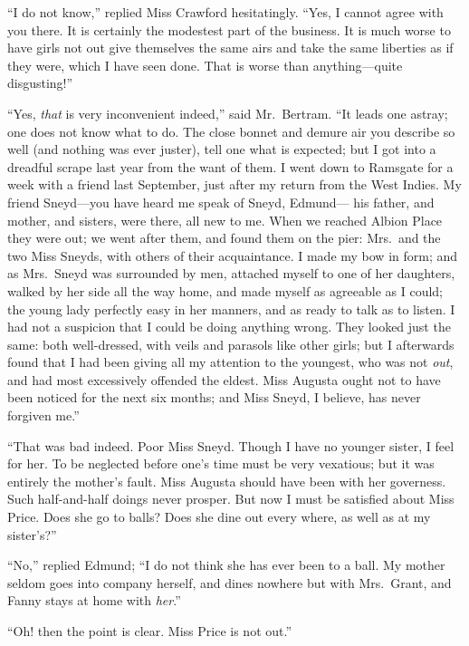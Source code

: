 ``I do not know,'' replied Miss Crawford hesitatingly.
``Yes, I cannot agree with you there.  It is certainly
the modestest part of the business.  It is much worse to
have girls not out give themselves the same airs and take
the same liberties as if they were, which I have seen done.
That is worse than anything---quite disgusting!''

``Yes, \emph{that} is very inconvenient indeed,'' said Mr.\ Bertram.
``It leads one astray; one does not know what to do.
The close bonnet and demure air you describe so well (and
nothing was ever juster), tell one what is expected;
but I got into a dreadful scrape last year from the want
of them.  I went down to Ramsgate for a week with a friend
last September, just after my return from the West Indies.
My friend Sneyd---you have heard me speak of Sneyd, Edmund---%
his father, and mother, and sisters, were there, all new
to me.  When we reached Albion Place they were out;
we went after them, and found them on the pier:  Mrs.\ and
the two Miss Sneyds, with others of their acquaintance.
I made my bow in form; and as Mrs.\ Sneyd was surrounded
by men, attached myself to one of her daughters,
walked by her side all the way home, and made myself
as agreeable as I could; the young lady perfectly easy
in her manners, and as ready to talk as to listen.
I had not a suspicion that I could be doing anything wrong.
They looked just the same:  both well-dressed, with veils
and parasols like other girls; but I afterwards found
that I had been giving all my attention to the youngest,
who was not \emph{out}, and had most excessively offended
the eldest.  Miss Augusta ought not to have been noticed
for the next six months; and Miss Sneyd, I believe, has never
forgiven me.''

``That was bad indeed.  Poor Miss Sneyd.  Though I have no
younger sister, I feel for her.  To be neglected before
one's time must be very vexatious; but it was entirely
the mother's fault.  Miss Augusta should have been with
her governess.  Such half-and-half doings never prosper.
But now I must be satisfied about Miss Price.
Does she go to balls?  Does she dine out every where,
as well as at my sister's?''

``No,'' replied Edmund; ``I do not think she has ever been
to a ball.  My mother seldom goes into company herself,
and dines nowhere but with Mrs.\ Grant, and Fanny stays at
home with \emph{her}.''

``Oh! then the point is clear.  Miss Price is not out.''



